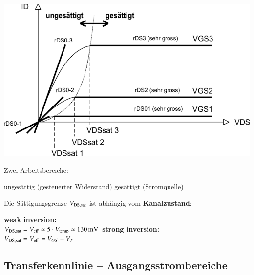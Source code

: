 \begin{minipage}[t]{0.5\columnwidth}
    \includegraphics[width=\columnwidth, align=t]{images/02_MOSFET_ausgangskennlinien.pdf}
\end{minipage}
\hfill
\begin{minipage}[t]{0.48\columnwidth}
    Zwei Arbeitsbereiche: 

    \begin{outline}
        \1 ungesättig (gesteuerter Widerstand)
        \1 gesättigt (Stromquelle)
    \end{outline}

    \medskip

    Die Sättigungsgrenze $V_{\rm DS, sat}$ ist abhängig vom \textbf{Kanalzustand}:

    \begin{outline}
        \1 \textbf{weak inversion:} \\
            $V_{\rm DS, sat} = V_{\rm eff} \approx 5 \cdot V_{\rm temp} \approx \qty{130}{\milli \volt}$ 
        \1 \textbf{strong inversion:} \\
            $V_{\rm DS, sat} = V_{\rm eff} = V_{GS} - V_T$ 
    \end{outline}
\end{minipage}



\subsection{Transferkennlinie -- Ausgangsstrombereiche}



